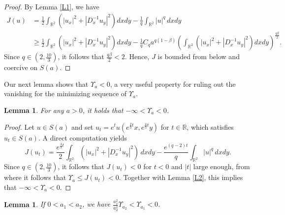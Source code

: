 \documentclass[11pt]{amsart}
\newtheorem{lemma}[theorem]{Lemma}
\numberwithin{equation}{section}
\newcommand\R{\mathbb R}
\begin{document}
{{{\begin{proof}
By Lemma \ref{L1}, we have
\begin{equation}
\begin{aligned}
J(u)&=\frac{1}{2}\int_{\mathbb{R}^{2}} \left(|u_{x}|^{2} + |D^{-1}_{x} u_{y}|^{2} \right)dx dy-\frac{1}{q}\int_{\mathbb{R}^2} |u|^q \,dxdy\\
&\geq\frac{1}{2}\int_{\mathbb{R}^{2}} \left(|u_{x}|^{2} + |D^{-1}_{x} u_{y}|^{2} \right)dx dy-\frac{1}{q}C_qa^{q(1-\beta)}\left(\int_{\mathbb{R}^2}\left(\left|u_x\right|^2+\left|D_x^{-1} u_y\right|^2\right) d xdy\right)^{\frac{q\beta}{2}}.
\end{aligned}
\end{equation}
Since $q\in (2, \frac{10}{3})$, it follows that ${\frac{q\beta}{2}}<2$. Hence, $J$ is bounded from below and coercive on $S(a)$.
\end{proof}
{Our next lemma shows that $\Upsilon_a<0$, a very useful property for ruling out the vanishing for the minimizing sequence of $\Upsilon_a$.}
\begin{lemma}\label{L12}
    For any $a>0$, it holds that $-\infty<\Upsilon_a<0$.
\end{lemma}
\begin{proof}
    Let $u\in S(a)$ and set $u_t=e^{t}u(e^{\frac{2}{3}t}x,e^{\frac{4}{3}t}y) $ for $t\in\R$, which satisfies $u_t\in S(a)$. {A direct computation yields}
    $$
    J(u_t)=\frac{e^{\frac{4}{3}t}}{2}\int_{\mathbb{R}^2}\left(|u_x|^2+|D^{-1}_{x} u_{y}|^2\right)\,dxdy-\frac{e^{(q-2)t}}{q}\int_{\mathbb{R}^2}|u|^q\,dxdy.
    $$
    Since $q\in(2,\frac{10}{3})$, it follows that $J(u_t)<0$ for $t<0$ and $|t|$ large enough, from where it follows that \linebreak  $\Upsilon_a \leq J\left(u_t\right)<0$. Together with Lemma \ref{L2}, this implies that $-\infty<\Upsilon_a<0$.
\end{proof}


\begin{lemma} \label{L3} If $0<a_1<a_2$, we have $\frac{a_1^2}{a_2^2}\Upsilon_{a_2}<\Upsilon_{a_1}<0$.


\end{lemma}}}}
\end{document}
